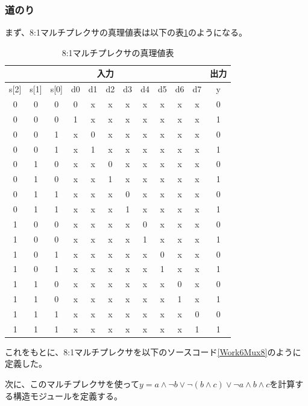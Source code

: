 \documentclass[a4paper]{jarticle}
\begin{document}
\subsubsection{道のり}
まず、8:1マルチプレクサの真理値表は以下の表\ref{Work6Mux8TruthTable}のようになる。
\begin{table}[ht]
	\begin{center}
		\caption{8:1マルチプレクサの真理値表}
		\label{Work6Mux8TruthTable}
		\begin{tabular}{|c|c|c|c|c|c|c|c|c|c|c||c|}
			\hline
			\multicolumn{11}{|c|}{入力} & \multicolumn{1}{|c|}{出力}\\	\hline\hline
			s[2]	&s[1]	&s[0]	&d0	&d1	&d2	&d3	&d4	&d5	&d6	&d7	&y\\	\hline\hline
			0	&0	&0	&0	&x	&x	&x	&x	&x	&x	&x	&0\\	\hline
			0	&0	&0	&1	&x	&x	&x	&x	&x	&x	&x	&1\\	\hline
			0	&0	&1	&x	&0	&x	&x	&x	&x	&x	&x	&0\\	\hline
			0	&0	&1	&x	&1	&x	&x	&x	&x	&x	&x	&1\\	\hline
			0	&1	&0	&x	&x	&0	&x	&x	&x	&x	&x	&0\\	\hline
			0	&1	&0	&x	&x	&1	&x	&x	&x	&x	&x	&1\\	\hline
			0	&1	&1	&x	&x	&x	&0	&x	&x	&x	&x	&0\\	\hline
			0	&1	&1	&x	&x	&x	&1	&x	&x	&x	&x	&1\\	\hline
			1	&0	&0	&x	&x	&x	&x	&0	&x	&x	&x	&0\\	\hline
			1	&0	&0	&x	&x	&x	&x	&1	&x	&x	&x	&1\\	\hline
			1	&0	&1	&x	&x	&x	&x	&x	&0	&x	&x	&0\\	\hline
			1	&0	&1	&x	&x	&x	&x	&x	&1	&x	&x	&1\\	\hline
			1	&1	&0	&x	&x	&x	&x	&x	&x	&0	&x	&0\\	\hline
			1	&1	&0	&x	&x	&x	&x	&x	&x	&1	&x	&1\\	\hline
			1	&1	&1	&x	&x	&x	&x	&x	&x	&x	&0	&0\\	\hline
			1	&1	&1	&x	&x	&x	&x	&x	&x	&x	&1	&1\\	\hline
		\end{tabular}
	\end{center}
\end{table}
これをもとに、8:1マルチプレクサを以下のソースコード\ref{Work6Mux8}のように定義した。

次に、このマルチプレクサを使って$y = a \land \lnot b \lor \lnot \left( b \land c \right) \lor \lnot a \land b \land c$を計算する構造モジュールを定義する。
\end{document}
